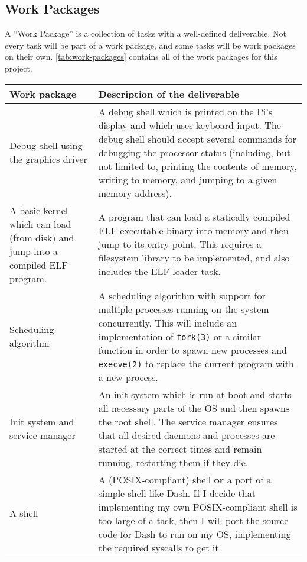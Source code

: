 \documentclass{article}
\begin{document}
\subsection*{Work Packages}
A ``Work Package'' is a collection of tasks with a well-defined deliverable.
Not every task will be part of a work package, and some tasks will be work
packages on their own. \autoref{tab:work-packages} contains all of the work
packages for this project.

\begin{table}[tbp]
\begin{center}
\begin{tabular}{|p{45mm}|p{125mm}|}
    \hline
    \textbf{Work package} & \textbf{Description of the deliverable} \\
    \hline
    Debug shell using the graphics driver &
    A debug shell which is printed on the Pi's display and which uses keyboard
    input. The debug shell should accept several commands for debugging the
    processor status (including, but not limited to, printing the contents of
    memory, writing to memory, and jumping to a given memory address).
    \\ \hline
    A basic kernel which can load (from disk) and jump into a compiled ELF
    program. &
    A program that can load a statically compiled ELF executable binary into
    memory and then jump to its entry point. This requires a filesystem library
    to be implemented, and also includes the ELF loader task.
    \\ \hline
    Scheduling algorithm &
    A scheduling algorithm with support for multiple processes running on the
    system concurrently. This will include an implementation of
    \texttt{fork(3)} or a similar function in order to spawn new processes and
    \texttt{execve(2)} to replace the current program with a new process.
    \\ \hline
    Init system and service manager &
    An init system which is run at boot and starts all necessary parts of the
    OS and then spawns the root shell. The service manager ensures that all
    desired daemons and processes are started at the correct times and remain
    running, restarting them if they die.
    \\ \hline
    A shell &
    A (POSIX-compliant) shell \textbf{or} a port of a simple shell like
    Dash\cite{dash-shell}. If I decide that implementing my own
    POSIX-compliant shell is too large of a task, then I will port the source
    code for Dash to run on my OS, implementing the required syscalls to get it

\end{tabular}
\end{center}
\end{table}
\end{document}
